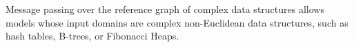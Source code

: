 Message passing over the reference graph of complex data structures allows models whose input domains are complex non-Euclidean data structures, such as hash tables, B-trees, or Fibonacci Heaps.